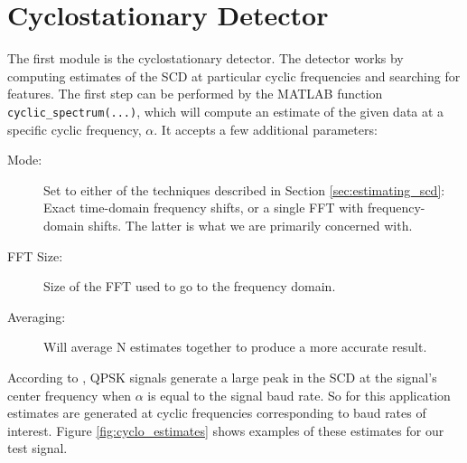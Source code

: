 \documentclass[12pt]{report}
\begin{document}
\section{Cyclostationary Detector}
\label{sec:sim_cyclo}
The first module is the cyclostationary detector. The detector works by
computing estimates of the SCD at particular cyclic frequencies and searching
for features. The first step can be performed by the MATLAB function
\texttt{cyclic\_spectrum(...)}, which will compute an estimate of the given
data at a specific cyclic frequency, $\alpha$.  It accepts a few additional
parameters:

\begin{description}
    \item[Mode:] Set to either of the techniques described in Section
    \ref{sec:estimating_scd}: Exact time-domain frequency shifts, or a single
    FFT with frequency-domain shifts. The latter is what we are primarily concerned
    with.
    \item[FFT Size:] Size of the FFT used to go to the frequency domain.
    \item[Averaging:] Will average N estimates together to produce a more accurate
    result.
\end{description}

According to \cite{Gardner2}, QPSK signals generate a large peak in the SCD at
the signal's center frequency when $\alpha$ is equal to the signal baud rate.
So for this application estimates are generated at cyclic frequencies
corresponding to baud rates of interest. Figure \ref{fig:cyclo_estimates} shows
examples of these estimates for our test signal.
\end{document}

